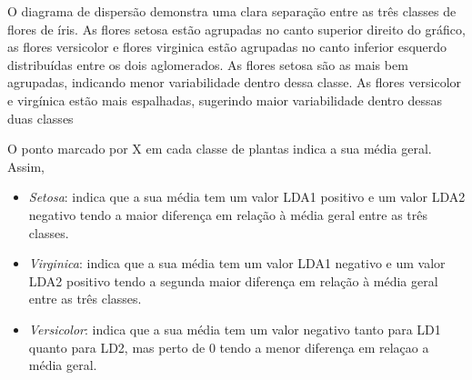 \documentclass[
  a4paperpaper,
]{article}
\providecommand{\tightlist}{%
  \setlength{\itemsep}{0pt}\setlength{\parskip}{0pt}}\usepackage{longtable,booktabs,array}
\begin{document}
O diagrama de dispersão demonstra uma clara separação entre as três
classes de flores de íris. As flores setosa estão agrupadas no canto
superior direito do gráfico, as flores versicolor e flores virginica
estão agrupadas no canto inferior esquerdo distribuídas entre os dois
aglomerados. As flores setosa são as mais bem agrupadas, indicando menor
variabilidade dentro dessa classe. As flores versicolor e virgínica
estão mais espalhadas, sugerindo maior variabilidade dentro dessas duas
classes

O ponto marcado por X em cada classe de plantas indica a sua média
geral. Assim,

\begin{itemize}
\tightlist
\item
  \emph{Setosa}: indica que a sua média tem um valor LDA1 positivo e um
  valor LDA2 negativo tendo a maior diferença em relação à média geral
  entre as três classes.
\item
  \emph{Virginica}: indica que a sua média tem um valor LDA1 negativo e
  um valor LDA2 positivo tendo a segunda maior diferença em relação à
  média geral entre as três classes.
\item
  \emph{Versicolor}: indica que a sua média tem um valor negativo tanto
  para LD1 quanto para LD2, mas perto de 0 tendo a menor diferença em
  relaçao a média geral.
\end{itemize}

~
\end{document}
